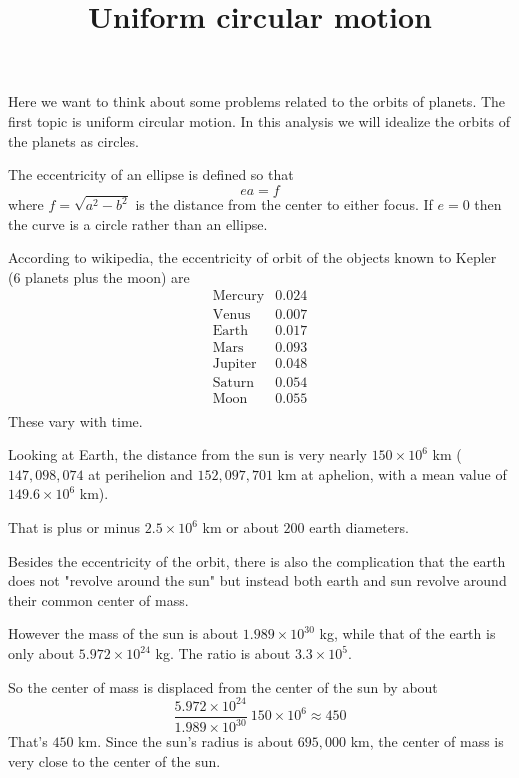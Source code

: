 \documentclass[11pt, oneside]{article}
\title{Uniform circular motion}
\date{}
\begin{document}
\maketitle
\Large

\label{sec:Uniform_circular_motion}

Here we want to think about some problems related to the orbits of planets.  The first topic is uniform circular motion.  In this analysis we will idealize the orbits of the planets as circles.

The eccentricity of an ellipse is defined so that
\[ ea = f  \] 
where $f = \sqrt{a^2 - b^2}$ is the distance from the center to either focus.  If $e = 0$ then the curve is a circle rather than an ellipse.

According to wikipedia, the eccentricity of orbit of the objects known to Kepler (6 planets plus the moon) are
\[ 
\begin{array}{lcr}
\mbox{Mercury} & 0.024  \\
\mbox{Venus} & 0.007  \\
\mbox{Earth} & 0.017  \\
\mbox{Mars} & 0.093  \\
\mbox{Jupiter} & 0.048  \\
\mbox{Saturn} & 0.054  \\
\mbox{Moon} & 0.055  \\
\end{array}
\] 
These vary with time.

Looking at Earth, the distance from the sun is very nearly $150 \times 10^6$ km ($147,098,074$ at perihelion and $152,097,701$ km at aphelion, with a mean value of $149.6 \times 10^6$ km).

That is plus or minus $2.5 \times 10^6$ km or about $200$ earth diameters.

Besides the eccentricity of the orbit, there is also the complication that the earth does not "revolve around the sun" but instead both earth and sun revolve around their common center of mass. 

However the mass of the sun is about  $1.989 \times 10^{30}$ kg, while that of the earth is only about $5.972 \times 10^{24}$ kg.  The ratio is about $3.3 \times 10^5$.

So the center of mass is displaced from the center of the sun by about 
\[ \frac{5.972 \times 10^{24}}{1.989 \times 10^{30}} \ 150 \times 10^6 \approx 450 \]
That's $450$ km.  Since the sun's radius is about $695,000$ km, the center of mass is very close to the center of the sun.
\end{document}
